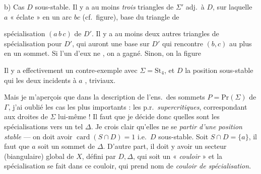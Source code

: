 \documentclass[11pt,a4paper]{article}
\begin{document}
b) Cas $D$ sous-stable.  Il y a au moins \emph{trois} triangles  de $\Sigma'$ adj.\ à $D$, \struck{\ill{}}   sur laquelle $a$ « éclate » en un arc $bc$ (cf.\ figure), base du triangle de

spécialisation $(a\,b\,c)$ de $D'$. Il y a au moins deux autres triangles de spécialisation \struck{\ill{}} pour $D'$, qui auront une base sur $D'$ \struck{\ill{}} qui rencontre $(b, c)$ au plus en un sommet. Si l'un d'eux ne  , on a gagné. Sinon, on  la figure

Il y a effectivement un contre-exemple avec $\Sigma = \mathrm{St}_4$, et $D$ \struck{\ill{}} la position sous-stable qui  les deux  incidents à $a$   , \ill{} triviaux.

Mais je m'aperçois que dans la description de l'ens.\ des sommets $P = \mathrm{Pr}(\Sigma)$ de $\Gamma$, j'ai oublié les cas les plus importants : les p.r.\ \emph{supercritiques}, correspondant aux droites de $\Sigma$ lui-même ! Il faut que je décide donc quelles sont les spécialisations vers un tel $\Delta$. Je crois clair qu'elles ne  se   \emph{partir d'une position stable}  --- on doit avoir $\operatorname{card}(S \cap D) = 1$ i.e.\ $D$ sous-stable. Soit $S \cap D = \lbrace a \rbrace$, il faut que $a$ soit un sommet de $\Delta$. D'autre part, il doit y avoir un secteur (biangulaire) global de $X$, défini par $D, \Delta$, qui soit un « \emph{couloir} » et la spécialisation se fait dans ce couloir, qui prend nom de \emph{couloir de spécialisation}.
\end{document}
